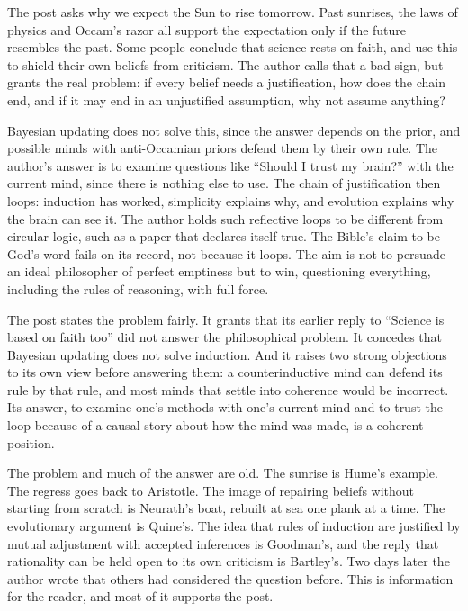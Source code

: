 \begin{afterword}
\summaryhead

The post asks why we expect the Sun to rise tomorrow. Past sunrises, the laws of physics and Occam's razor all support the expectation only if the future resembles the past. Some people conclude that science rests on faith, and use this to shield their own beliefs from criticism. The author calls that a bad sign, but grants the real problem: if every belief needs a justification, how does the chain end, and if it may end in an unjustified assumption, why not assume anything?

Bayesian updating does not solve this, since the answer depends on the prior, and possible minds with anti-Occamian priors defend them by their own rule. The author's answer is to examine questions like ``Should I trust my brain?'' with the current mind, since there is nothing else to use. The chain of justification then loops: induction has worked, simplicity explains why, and evolution explains why the brain can see it. The author holds such reflective loops to be different from circular logic, such as a paper that declares itself true. The Bible's claim to be God's word fails on its record, not because it loops. The aim is not to persuade an ideal philosopher of perfect emptiness but to win, questioning everything, including the rules of reasoning, with full force.

\responsehead

The post states the problem fairly. It grants that its earlier reply to ``Science is based on faith too'' did not answer the philosophical problem. It concedes that Bayesian updating does not solve induction. And it raises two strong objections to its own view before answering them: a counterinductive mind can defend its rule by that rule, and most minds that settle into coherence would be incorrect. Its answer, to examine one's methods with one's current mind and to trust the loop because of a causal story about how the mind was made, is a coherent position.

The problem and much of the answer are old. The sunrise is Hume's example. The regress goes back to Aristotle. The image of repairing beliefs without starting from scratch is Neurath's boat, rebuilt at sea one plank at a time. The evolutionary argument is Quine's. The idea that rules of induction are justified by mutual adjustment with accepted inferences is Goodman's, and the reply that rationality can be held open to its own criticism is Bartley's. Two days later the author wrote that others had considered the question before. This is information for the reader, and most of it supports the post.


\end{afterword}
